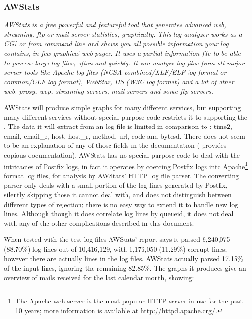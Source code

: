 \subsubsection{AWStats}

\textit{AWStats is a free powerful and featureful tool that generates
advanced web, streaming, ftp or mail server statistics, graphically. This
log analyzer works as a CGI or from command line and shows you all possible
information your log contains, in few graphical web pages. It uses a
partial information file to be able to process large log files, often and
quickly. It can analyze log files from all major server tools like Apache
log files (NCSA combined/XLF/ELF log format or common/CLF log format),
WebStar, IIS (W3C log format) and a lot of other web, proxy, wap, streaming
servers, mail servers and some ftp servers.\/}

AWStats will produce simple graphs for many different services, but
supporting many different services without special purpose code restricts
it to supporting the \LCD{}.  The data it will extract from an \MTA{} log
file is limited in comparison to \parsername{}: \newline \tab{} time2,
email, email\_r, host, host\_r, method, url, code and bytesd.\newline
There does not seem to be an explanation of any of those fields in the
documentation (\parsername{} provides copious documentation).  AWStats has
no special purpose code to deal with the intricacies of Postfix logs, in
fact it operates by coercing Postfix logs into Apache\footnote{The Apache
web server is the most popular HTTP server in use for the past 10 years;
more information is available at \url{http://httpd.apache.org/}.} format
log files, for analysis by AWStats' HTTP log file parser.  The converting
parser only deals with a small portion of the log lines generated by
Postfix, silently skipping those it cannot deal with, and does not
distinguish between different types of rejection; there is no easy way to
extend it to handle new log lines.  Although though it does correlate log
lines by queueid, it does not deal with any of the other complications
described in this document.

When tested with the \numberOFlogFILES{} test log files AWStats' report
says it parsed 9,240,075 (88.70\%) log lines out of 10,416,129, with
1,176,050 (11.29\%) corrupt lines; however there are actually
\numberOFlogLINES{} lines in the \numberOFlogFILES{} log files.  AWStats
actually parsed 17.15\% of the input lines, ignoring the remaining 82.85\%.
The graphs it produces give an overview of mails received for the last
calendar month, showing:

